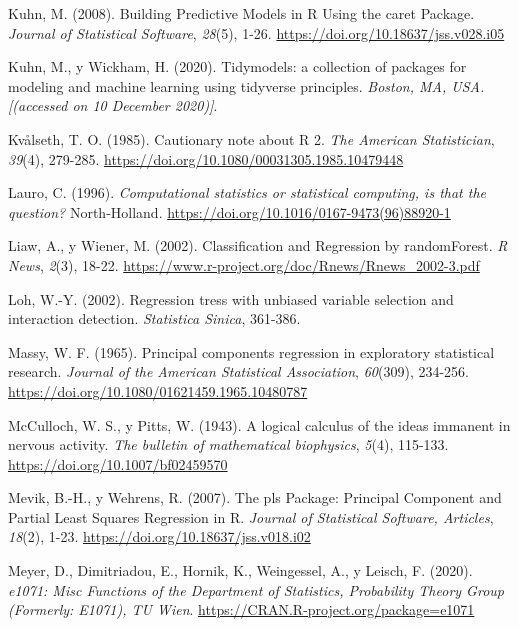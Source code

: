 \documentclass[
  spanish,
]{book}
\theoremstyle{break}
\theoremstyle{definition}
\theoremstyle{definition}
\theoremstyle{definition}
\theoremstyle{remark}
\begin{document}
\leavevmode\hypertarget{ref-kuhn2008building}{}%
Kuhn, M. (2008). Building Predictive Models in R Using the caret Package. \emph{Journal of Statistical Software}, \emph{28}(5), 1-26. \url{https://doi.org/10.18637/jss.v028.i05}

\leavevmode\hypertarget{ref-kuhn2020tidymodels}{}%
Kuhn, M., y Wickham, H. (2020). Tidymodels: a collection of packages for modeling and machine learning using tidyverse principles. \emph{Boston, MA, USA.{[}(accessed on 10 December 2020){]}}.

\leavevmode\hypertarget{ref-kvaalseth1985cautionary}{}%
Kvålseth, T. O. (1985). Cautionary note about R 2. \emph{The American Statistician}, \emph{39}(4), 279-285. \url{https://doi.org/10.1080/00031305.1985.10479448}

\leavevmode\hypertarget{ref-lauro1996computational}{}%
Lauro, C. (1996). \emph{Computational statistics or statistical computing, is that the question?} North-Holland. \url{https://doi.org/10.1016/0167-9473(96)88920-1}

\leavevmode\hypertarget{ref-liaw2002classification}{}%
Liaw, A., y Wiener, M. (2002). Classification and Regression by randomForest. \emph{R News}, \emph{2}(3), 18-22. \url{https://www.r-project.org/doc/Rnews/Rnews_2002-3.pdf}

\leavevmode\hypertarget{ref-loh2002regression}{}%
Loh, W.-Y. (2002). Regression tress with unbiased variable selection and interaction detection. \emph{Statistica Sinica}, 361-386.

\leavevmode\hypertarget{ref-massy1965principal}{}%
Massy, W. F. (1965). Principal components regression in exploratory statistical research. \emph{Journal of the American Statistical Association}, \emph{60}(309), 234-256. \url{https://doi.org/10.1080/01621459.1965.10480787}

\leavevmode\hypertarget{ref-mcculloch1943logical}{}%
McCulloch, W. S., y Pitts, W. (1943). A logical calculus of the ideas immanent in nervous activity. \emph{The bulletin of mathematical biophysics}, \emph{5}(4), 115-133. \url{https://doi.org/10.1007/bf02459570}

\leavevmode\hypertarget{ref-Mevik2007pls}{}%
Mevik, B.-H., y Wehrens, R. (2007). The pls Package: Principal Component and Partial Least Squares Regression in R. \emph{Journal of Statistical Software, Articles}, \emph{18}(2), 1-23. \url{https://doi.org/10.18637/jss.v018.i02}

\leavevmode\hypertarget{ref-R-e1071}{}%
Meyer, D., Dimitriadou, E., Hornik, K., Weingessel, A., y Leisch, F. (2020). \emph{e1071: Misc Functions of the Department of Statistics, Probability Theory Group (Formerly: E1071), TU Wien}. \url{https://CRAN.R-project.org/package=e1071}
\end{document}
